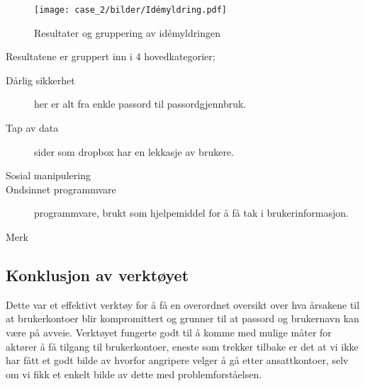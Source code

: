 \begin{figure}[H]
    \centering
    \texttt{[image: case\_2/bilder/Idémyldring.pdf]}
    \label{fig:idemyldring}
    \caption[Idémyldring]{Resultater og gruppering av idémyldringen}
\end{figure}

Resultatene er gruppert inn i 4 hovedkategorier;
\begin{description}
    \item[Dårlig sikkerhet] her er alt fra enkle passord til passordgjennbruk.
    \item [Tap av data] sider som dropbox har en lekkasje av brukere.
    \item[Sosial manipulering] 
    \item [Ondsinnet programmvare] programmvare, brukt som hjelpemiddel for å få tak i brukerinformasjon.
\end{description}
Merk 
\subsection{Konklusjon av verktøyet}
Dette var et effektivt verktøy for å få en overordnet oversikt over hva årsakene til at brukerkontoer blir kompromittert og grunner til at passord og brukernavn kan være på avveie. Verktøyet fungerte godt til å komme med mulige måter for aktører å få tilgang til brukerkontoer, eneste som trekker tilbake er det at vi ikke har fått et godt bilde av hvorfor angripere velger å gå etter ansattkontoer, selv om vi fikk et enkelt bilde av dette med problemforståelsen.